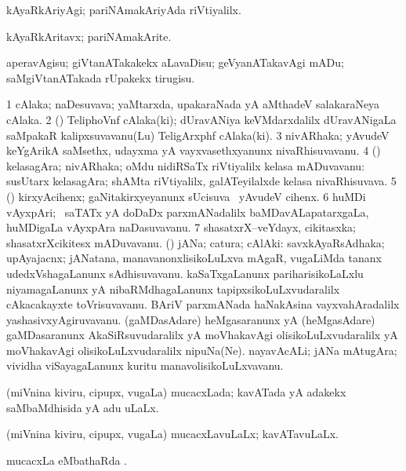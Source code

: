 \bentry
{}
\gl{\kirxvi}
\bmng
kAyaRkAriyAgi; pariNAmakAriyAda riVtiyalilx. 
\emng
\eentry

\bentry
{}
\gl{\nA}
\bmng
kAyaRkAritavx; pariNAmakArite. 
\emng
\eentry

\bentry
{}
\gl{\sakirx}
\bmng
aperavAgisu; giVtanATakakekx aLavaDisu; geVyanATakavAgi mADu; saMgiVtanATakada rUpakekx tirugisu. 
\emng
\eentry

\bentry
{}
\gl{\nA}
\bmng
\bnum
\num{1} cAlaka; naDesuvava; yaMtarxda, upakaraNada yA aMthadeV salakaraNeya cAlaka. 
\num{2} (\kanmu) TeliphoVnf cAlaka(ki); dUravANiya keVMdarxdalilx dUravANigaLa saMpakaR kalipxsuvavanu(Lu)  TeligArxphf cAlaka(ki). 
\num{3} nivARhaka; yAvudeV keYgArikA saMsethx, udayxma yA vayxvasethxyanunx nivaRhisuvavanu. 
\num{4} (\AmA) kelasagAra; nivARhaka; oMdu nidiRSaTx riVtiyalilx kelasa mADuvavanu:  susUtarx kelasagAra; shAMta riVtiyalilx, galATeyilalxde kelasa nivaRhisuvava. 
\num{5} (\ga) kirxyAcihenx; gaNitakirxyeyanunx sUcisuva \eng{$+,\;\times,\;\div$} \mo\ yAvudeV cihenx. 
\num{6} huMDi vAyxpAri; \kanmu\ saTATx yA doDaDx parxmANadalilx baMDavALapatarxgaLa, huMDigaLa vAyxpAra naDasuvavanu. 
\num{7} shasatxrX--veYdayx, cikitasxka; shasatxrXcikitesx mADuvavanu. 
 (\ashi) jANa; catura; cAlAki: 
\banum
{} savxkAyaRsAdhaka; upAyajacnx; jANatana, manavanonxlisikoLuLxva mAgaR, \mo vugaLiMda tananx udedxVshagaLanunx sAdhisuvavanu. 
 kaSaTxgaLanunx pariharisikoLaLxlu niyamagaLanunx yA nibaRMdhagaLanunx tapipxsikoLuLxvudaralilx cAkacakayxte toVrisuvavanu. 
 BAriV parxmANada haNakAsina vayxvahAradalilx yashasivxyAgiruvavanu. 
 (gaMDasAdare) heMgasaranunx yA (heMgasAdare) gaMDasaranunx AkaSiRsuvudaralilx yA moVhakavAgi olisikoLuLxvudaralilx yA moVhakavAgi olisikoLuLxvudaralilx nipuNa(Ne). 
 nayavAcALi; jANa mAtugAra; vividha viSayagaLanunx kuritu manavolisikoLuLxvavanu. 
\eanum
\numie
\enum
\emng
\eentry

\bentry
{}
\gl{\gu}
\bmng
(miVnina kiviru, cipupx, \mo vugaLa) mucacxLada; kavATada yA adakekx saMbaMdhisida yA adu uLaLx. 
\emng
\eentry

\bentry
{}
\gl{\gu}
\bmng
(miVnina kiviru, cipupx, \mo vugaLa) mucacxLavuLaLx; kavATavuLaLx. 
\emng
\eentry

\bentry
{}
\gl{\sapUpa}
\bmng
mucacxLa eMbathaRda \sapUpa. 
\emng
\eentry

